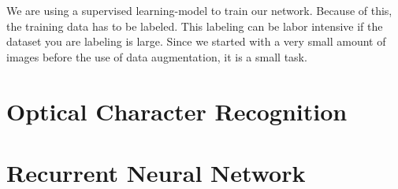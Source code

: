We are using a supervised learning-model to train our network.
Because of this, the training data has to be labeled.
This labeling can be labor intensive if the dataset you are labeling is large.
Since we started with a very small amount of images before the use of data augmentation, it is a small task.

\section{Optical Character Recognition}\label{sec:OCR}



\section{Recurrent Neural Network}\label{sec:RNN}

